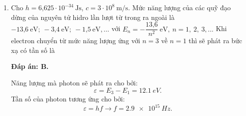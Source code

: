 \begin{enumerate}[label=\bfseries Câu \arabic*:]
	\item {} 
		\cauhoi
	{Cho $h=\text{6,625}\cdot 10^{-34}\ \text{Js}$, $c=3\cdot 10^8\ \text{m/s}$. Mức năng lượng của các quỹ đạo dừng của nguyên tử hidro lần lượt từ trong ra ngoài là $-\text{13,6}\ \text{eV}; \ -\text{3,4}\ \text{eV};\ -\text{1,5}\ \text{eV},...$ với $E_n=-\dfrac{\text{13,6}}{n^2}\ \text{eV}, \ n=1, \ 2, \ 3,...$   Khi electron chuyển từ mức năng lượng ứng với $n = 3$ về $n = 1$ thì sẽ phát ra bức xạ có tần số là 
	}
	
	\loigiai
	{		\textbf{Đáp án: B.}
		
Năng lượng mà photon sẽ phát ra cho bởi:
$$
	\varepsilon = E_{3} - E_{1} = \SI{12,1}{eV}.
$$
Tần số của photon tương ứng cho bởi:
$$
	\varepsilon = hf \rightarrow f = \SI{2,9 e15}{Hz}.
$$
		
	}
	
\end{enumerate}



